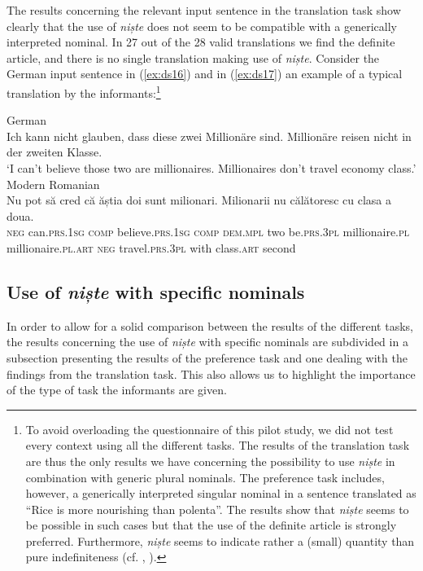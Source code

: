 \documentclass[output=paper,colorlinks,citecolor=brown]{langscibook}
\begin{document}
The results concerning the relevant input sentence in the translation task show clearly that the use of \textit{niște} does not seem to be compatible with a generically interpreted nominal. In 27 out of the 28 valid translations we find the definite article, and there is no single translation making use of \textit{niște}. Consider the German input sentence in (\ref{ex:ds16}) and in (\ref{ex:ds17}) an example of a typical translation by the informants:\footnote{To avoid overloading the questionnaire of this pilot study, we did not test every context using all the different tasks. The results of the translation task are thus the only results we have concerning the possibility to use \textit{niște} in combination with generic plural nominals. The preference task includes, however, a generically interpreted singular nominal in a sentence translated as “Rice is more nourishing than polenta”. The results show that \textit{niște} seems to be possible in such cases but that the use of the definite article is strongly preferred. Furthermore, \textit{niște} seems to indicate rather a (small) quantity than pure indefiniteness (cf. \cite{Davatz2018}, \cite{DavatzStark2019}).}

\ea\label{ex:ds16} German\\
Ich kann nicht glauben, dass diese zwei Millionäre sind. Millionäre reisen nicht in der zweiten Klasse.\\
\glt ‘I can’t believe those two are millionaires. Millionaires don’t travel economy class.’
\ex \label{ex:ds17} Modern Romanian\\
    \gll Nu pot s\u{a} cred c\u{a} \u{a}știa doi sunt milionari. Milionarii nu c\u{a}l\u{a}toresc       cu clasa a doua.\\
     \textsc{neg} can.\textsc{prs}.1\textsc{sg} \textsc{comp} believe.\textsc{prs}.1\textsc{sg} \textsc{comp} \textsc{dem.mpl}  two be.\textsc{prs.}3\textsc{pl} millionaire.\textsc{pl} millionaire.\textsc{pl.art} \textsc{neg} travel.\textsc{prs}.3\textsc{pl} with class.\textsc{art} second\\
\z

\subsection{Use of \textit{niște} with specific nominals}\label{sec:ds4.3}

In order to allow for a solid comparison between the results of the different tasks, the results concerning the use of \textit{niște} with specific nominals are subdivided in a subsection presenting the results of the preference task and one dealing with the findings from the translation task. This also allows us to highlight the importance of the type of task the informants are given.
\end{document}

